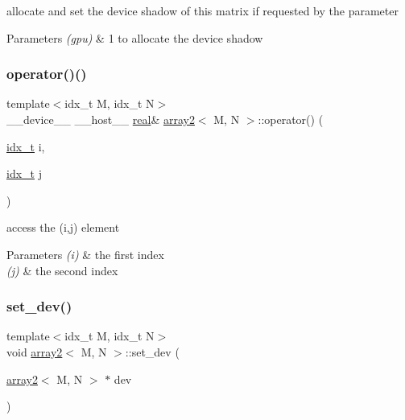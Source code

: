 allocate and set the device shadow of this matrix if requested by the parameter 


\begin{DoxyParams}{Parameters}
{\em (gpu)} & 1 to allocate the device shadow \\
\hline
\end{DoxyParams}
\mbox{\label{structarray2_a9761bc289064a82cf623fe12e37e2d90}} 
\subsubsection{\texorpdfstring{operator()()}{operator()()}}
{\footnotesize\ttfamily template$<$idx\+\_\+t M, idx\+\_\+t N$>$ \\
\+\_\+\+\_\+device\+\_\+\+\_\+ \+\_\+\+\_\+host\+\_\+\+\_\+ \hyperlink{vgg__util_8h_a1082d08aaa761215ec83e7149f27ad16}{real}\& \hyperlink{structarray2}{array2}$<$ M, N $>$\+::operator() (\begin{DoxyParamCaption}\item[{\hyperlink{vgg__util_8h_a8e93478a00e685bea5e6a3f617bf03a3}{idx\+\_\+t}}]{i,  }\item[{\hyperlink{vgg__util_8h_a8e93478a00e685bea5e6a3f617bf03a3}{idx\+\_\+t}}]{j }\end{DoxyParamCaption})\hspace{0.3cm}{\ttfamily [inline]}}



access the (i,j) element 


\begin{DoxyParams}{Parameters}
{\em (i)} & the first index \\
\hline
{\em (j)} & the second index \\
\hline
\end{DoxyParams}
\mbox{\label{structarray2_a8f0b78337c66dbcc6252d19b756006ea}} 
\subsubsection{\texorpdfstring{set\+\_\+dev()}{set\_dev()}}
{\footnotesize\ttfamily template$<$idx\+\_\+t M, idx\+\_\+t N$>$ \\
void \hyperlink{structarray2}{array2}$<$ M, N $>$\+::set\+\_\+dev (\begin{DoxyParamCaption}\item[{\hyperlink{structarray2}{array2}$<$ M, N $>$ $\ast$}]{dev }\end{DoxyParamCaption})\hspace{0.3cm}{\ttfamily [inline]}}



